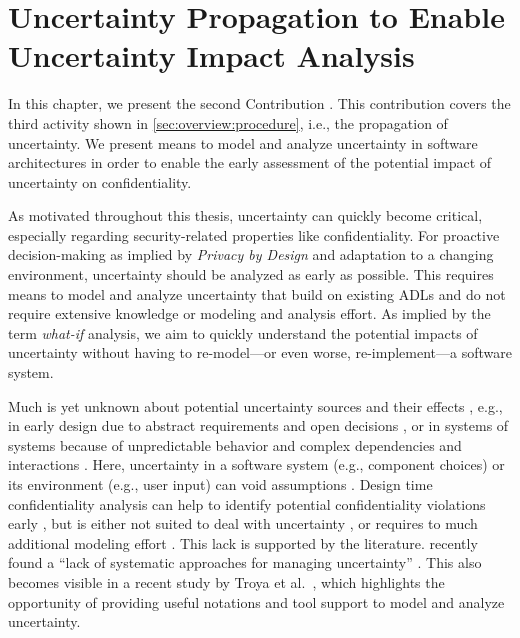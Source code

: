 \chapter{Uncertainty Propagation to Enable Uncertainty Impact Analysis}%
\label{ch:impactanalysis}%


In this chapter, we present the second Contribution .
This contribution covers the third activity shown in \autoref{sec:overview:procedure}, i.e., the propagation of uncertainty.
We present means to model and analyze uncertainty in software architectures in order to enable the early assessment of the potential impact of uncertainty on confidentiality.

As motivated throughout this thesis, uncertainty can quickly become critical, especially regarding security-related properties like confidentiality.
For proactive decision-making as implied by \emph{Privacy by Design} \cite{schaar_privacy_2010} and adaptation to a changing environment, uncertainty should be analyzed as early as possible.
This requires means to model and analyze uncertainty that build on existing \acfp{ADL} and do not require extensive knowledge or modeling and analysis effort.
As implied by the term \emph{what-if} analysis, we aim to quickly understand the potential impacts of uncertainty without having to re-model---or even worse, re-implement---a software system.

Much is yet unknown about potential uncertainty sources and their effects \cite{hahner_dealing_2021}, e.g., in early design due to abstract requirements and open decisions \cite{mcconnell_software_1998}, or in systems of systems because of unpredictable behavior and complex dependencies and interactions \cite{oquendo_coping_2019,camara_addressing_2022}.
Here, uncertainty in a software system (e.g., component choices) or its environment (e.g., user input) can void assumptions \cite{acosta_uncertainty_2022}.
Design time confidentiality analysis can help to identify potential confidentiality violations early \cite{seifermann_detecting_2022}, but is either not suited to deal with uncertainty \cite{seifermann_architectural_2022}, or requires to much additional modeling effort \cite{boltz_handling_2022, walter_architectural_2022}.
This lack is supported by the literature.
\textcite{hezavehi_uncertainty_2021} recently found a \enquote{lack of systematic approaches for managing uncertainty} \cite{hezavehi_uncertainty_2021}.
This also becomes visible in a recent study by Troya et al.~\cite{troya_uncertainty_2021}, which highlights the opportunity of providing useful notations and tool support to model and analyze uncertainty.


